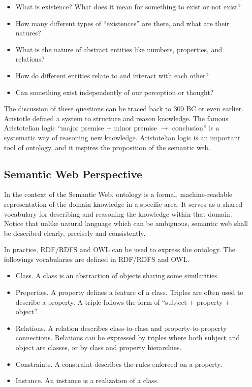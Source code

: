 \begin{itemize}
  \item What is existence? What does it mean for something to exist or not exist?
  \item How many different types of ``existences'' are there, and what are their natures?
  \item What is the nature of abstract entities like numbers, properties, and relations?
  \item How do different entities relate to and interact with each other?
  \item Can something exist independently of our perception or thought?
\end{itemize}

The discussion of these questions can be traced back to $300$ BC or even earlier. Aristotle defined a system to structure and reason knowledge. The famous Aristotelian logic ``major premise + minor premise $\rightarrow$ conclusion'' is a systematic way of reasoning new knowledge. Aristotelian logic is an important tool of ontology, and it inspires the proposition of the semantic web.


\subsection{Semantic Web Perspective}

In the context of the Semantic Web, ontology is a formal, machine-readable representation of the domain knowledge in a specific area. It serves as a shared vocabulary for describing and reasoning the knowledge within that domain. Notice that unlike natural language which can be ambiguous, semantic web shall be described clearly, precisely and consistently.

In practice, RDF/RDFS and OWL can be used to express the ontology. The followings vocabularies are defined in RDF/RDFS and OWL.
\begin{itemize}
  \item Class. A class is an abstraction of objects sharing some similarities.
  \item Properties. A property defines a feature of a class. Triples are often used to describe a property. A triple follows the form of ``subject $+$ property $+$ object''.
  \item Relations. A relation describes class-to-class and property-to-property connections. Relations can be expressed by triples where both subject and object are classes, or by class and property hierarchies.
  \item Constraints. A constraint describes the rules enforced on a property.
  \item Instance. An instance is a realization of a class.
\end{itemize}

